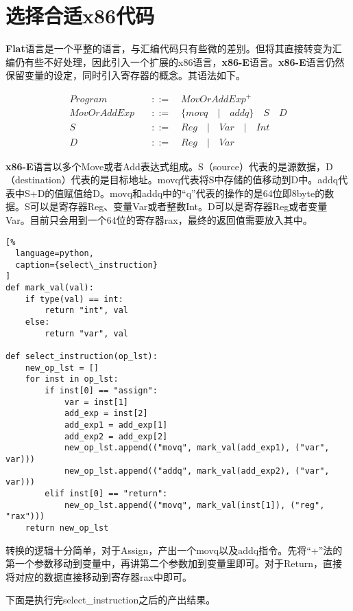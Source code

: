 \section{选择合适x86代码}

\textbf{Flat}语言是一个平整的语言，与汇编代码只有些微的差别。但将其直接转变为汇编仍有些不好处理，因此引入一个扩展的x86语言，\textbf{x86-E}语言。\textbf{x86-E}语言仍然保留变量的设定，同时引入寄存器的概念。其语法如下。

\begin{equation}
\begin{aligned}
  \label{eq:4}
   Program \quad &::= \quad { MovOrAddExp }^+ \\
   MovOrAddExp \quad &::= \quad \{ movq \quad | \quad addq \} \quad S \quad  D  \\
   S \quad &::= \quad Reg \quad | \quad Var \quad | \quad Int \\
   D \quad &::=  \quad Reg \quad | \quad Var
\end{aligned}
\end{equation}

\textbf{x86-E}语言以多个Move或者Add表达式组成。S（source）代表的是源数据，D（destination）代表的是目标地址。movq代表将S中存储的值移动到D中。addq代表中S+D的值赋值给D。movq和addq中的“q”代表的操作的是64位即8byte的数据。S可以是寄存器Reg、变量Var或者整数Int。D可以是寄存器Reg或者变量Var。目前只会用到一个64位的寄存器rax，最终的返回值需要放入其中。

\begin{lstlisting}[%
  language=python,
  caption={select\_instruction}
]
def mark_val(val):
    if type(val) == int:
        return "int", val
    else:
        return "var", val

def select_instruction(op_lst):
    new_op_lst = []
    for inst in op_lst:
        if inst[0] == "assign":
            var = inst[1]
            add_exp = inst[2]
            add_exp1 = add_exp[1]
            add_exp2 = add_exp[2]
            new_op_lst.append(("movq", mark_val(add_exp1), ("var", var)))
            new_op_lst.append(("addq", mark_val(add_exp2), ("var", var)))
        elif inst[0] == "return":
            new_op_lst.append(("movq", mark_val(inst[1]), ("reg", "rax")))
    return new_op_lst
\end{lstlisting}

转换的逻辑十分简单，对于Assign，产出一个movq以及addq指令。先将“+”法的第一个参数移动到变量中，再讲第二个参数加到变量里即可。对于Return，直接将对应的数据直接移动到寄存器rax中即可。

下面是执行完select\_instruction之后的产出结果。

